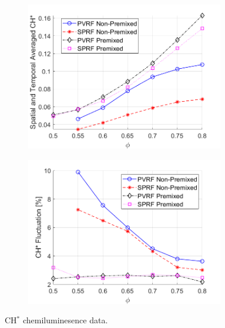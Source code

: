 \begin{figure}[h!]
	\begin{subfigure}[t]{0.5\textwidth}
	    \centering
            \includegraphics[width=0.95\textwidth]{Chapter5/Images/Experimental/Chemiluminiscene/imgAvgST1.png}
    	\label{fig:AvgCHs}
	\end{subfigure}
        \begin{subfigure}[t]{0.5\textwidth}
            \centering
            \includegraphics[width=0.95\textwidth]{Chapter5/Images/Experimental/Chemiluminiscene/coeffVar1.png}
    	\label{fig:CoeffVar}
        \end{subfigure}
\caption{CH$^*$ chemiluminesence data.}
\label{fig:ChemsData}
\end{figure}


